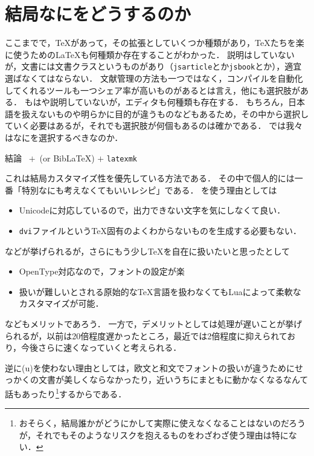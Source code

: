 \documentclass[./main]{subfiles}
\begin{document}
\section{結局なにをどうするのか}
\noindent
ここまでで，\TeX があって，その拡張としていくつか種類があり，\TeX たちを楽に使うための\LaTeX も何種類か存在することがわかった．
説明はしていないが，文書には文書クラスというものがあり（\verb|jsarticle|とか\verb|jsbook|とか），適宜選ばなくてはならない．
文献管理の方法も一つではなく，コンパイルを自動化してくれるツールも一つシェア率が高いものがあるとは言え，他にも選択肢がある．
もはや説明していないが，エディタも何種類も存在する．
もちろん，日本語を扱えないものや明らかに目的が違うものなどもあるため，その中から選択していく必要はあるが，それでも選択肢が何個もあるのは確かである．
では我々はなにを選択するべきなのか．

\begin{itembox}{結論}
  \centering
  \LuaLaTeX\ $+$ \upBibTeX\,(or Bib\LaTeX) $+$ \verb|latexmk| 
\end{itembox}
これは結局カスタマイズ性を優先している方法である．
その中で個人的には一番「特別なにも考えなくてもいいレシピ」である．
\LuaLaTeX を使う理由としては
\begin{itemize}
  \item Unicodeに対応しているので，出力できない文字を気にしなくて良い．
  \item \verb|dvi|ファイルという\TeX 固有のよくわからないものを生成する必要もない．
\end{itemize}
などが挙げられるが，さらにもう少し\TeX を自在に扱いたいと思ったとして
\begin{itemize}
  \item OpenType対応なので，フォントの設定が楽
  \item 扱いが難しいとされる原始的な\TeX 言語を扱わなくてもLuaによって柔軟なカスタマイズが可能．
\end{itemize}
などもメリットであろう\supercite{JPLaTeX_Yato}．
一方で，デメリットとして\LuaLaTeX は処理が遅いことが挙げられるが，以前は20倍程度遅かったところ，最近では2倍程度に抑えられており\supercite{LuaTeX_notslow}，今後さらに速くなっていくと考えられる．

逆に(u)\pLaTeX を使わない理由としては，欧文と和文でフォントの扱いが違うためにせっかくの文書が美しくならなかったり，近いうちにまともに動かなくなるなんて話もあったり\supercite{pLaTeX_danger}\footnote{おそらく，結局誰かがどうにかして実際に使えなくなることはないのだろうが，それでもそのようなリスクを抱えるものをわざわざ使う理由は特にない．}するからである．
\end{document}
